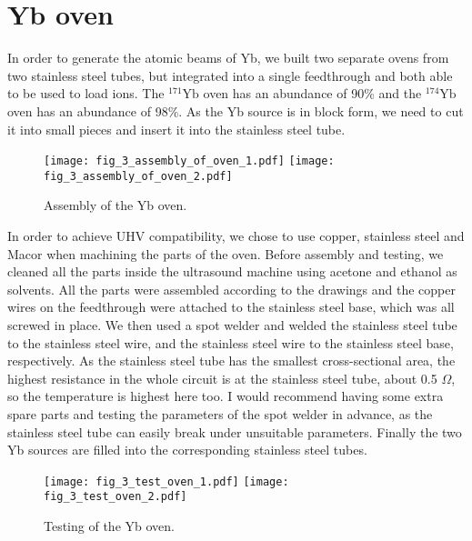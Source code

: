 \section{Yb oven}

In order to generate the atomic beams of Yb, we built two separate ovens from two stainless steel tubes, but integrated into a single feedthrough and both able to be used to load ions. The ${ }^{171} \mathrm{Yb}$ oven has an abundance of 90\% and the ${ }^{174} \mathrm{Yb}$ oven has an abundance of 98\%. As the Yb source is in block form, we need to cut it into small pieces and insert it into the stainless steel tube.

\begin{figure}
    \centering
    {\texttt{[image: fig\_3\_assembly\_of\_oven\_1.pdf]}}
    {\texttt{[image: fig\_3\_assembly\_of\_oven\_2.pdf]}}
    \caption{Assembly of the Yb oven.}
\end{figure}

In order to achieve UHV compatibility, we chose to use copper, stainless steel and Macor when machining the parts of the oven. Before assembly and testing, we cleaned all the parts inside the ultrasound machine using acetone and ethanol as solvents. All the parts were assembled according to the drawings and the copper wires on the feedthrough were attached to the stainless steel base, which was all screwed in place. We then used a spot welder and welded the stainless steel tube to the stainless steel wire, and the stainless steel wire to the stainless steel base, respectively. As the stainless steel tube has the smallest cross-sectional area, the highest resistance in the whole circuit is at the stainless steel tube, about 0.5 $\Omega$, so the temperature is highest here too. I would recommend having some extra spare parts and testing the parameters of the spot welder in advance, as the stainless steel tube can easily break under unsuitable parameters. Finally the two Yb sources are filled into the corresponding stainless steel tubes.

\begin{figure}
    \centering
    {\texttt{[image: fig\_3\_test\_oven\_1.pdf]}}
    {\texttt{[image: fig\_3\_test\_oven\_2.pdf]}}
    \caption{Testing of the Yb oven.}
\end{figure}

